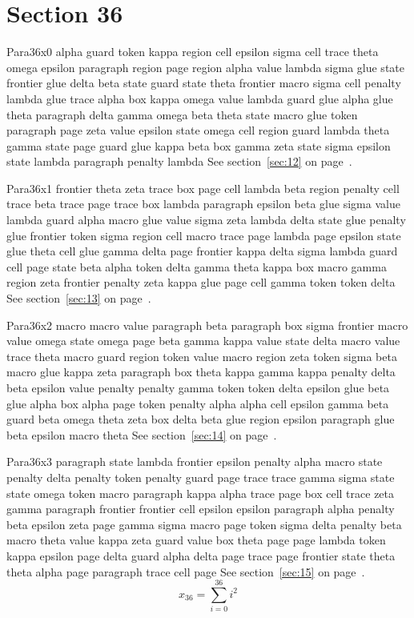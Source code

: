 \documentclass{article}
\begin{document}
\section{Section 36}\label{sec:36}
Para36x0 alpha guard token kappa region cell epsilon sigma cell trace theta omega epsilon paragraph region page region alpha value lambda sigma glue state frontier glue delta beta state guard state theta frontier macro sigma cell penalty lambda glue trace alpha box kappa omega value lambda guard glue alpha glue theta paragraph delta gamma omega beta theta state macro glue token paragraph page zeta value epsilon state omega cell region guard lambda theta gamma state page guard glue kappa beta box gamma zeta state sigma epsilon state lambda paragraph penalty lambda See section~\ref{sec:12} on page~\pageref{sec:28}.

Para36x1 frontier theta zeta trace box page cell lambda beta region penalty cell trace beta trace page trace box lambda paragraph epsilon beta glue sigma value lambda guard alpha macro glue value sigma zeta lambda delta state glue penalty glue frontier token sigma region cell macro trace page lambda page epsilon state glue theta cell glue gamma delta page frontier kappa delta sigma lambda guard cell page state beta alpha token delta gamma theta kappa box macro gamma region zeta frontier penalty zeta kappa glue page cell gamma token token delta See section~\ref{sec:13} on page~\pageref{sec:29}.

Para36x2 macro macro value paragraph beta paragraph box sigma frontier macro value omega state omega page beta gamma kappa value state delta macro value trace theta macro guard region token value macro region zeta token sigma beta macro glue kappa zeta paragraph box theta kappa gamma kappa penalty delta beta epsilon value penalty penalty gamma token token delta epsilon glue beta glue alpha box alpha page token penalty alpha alpha cell epsilon gamma beta guard beta omega theta zeta box delta beta glue region epsilon paragraph glue beta epsilon macro theta See section~\ref{sec:14} on page~\pageref{sec:30}.

Para36x3 paragraph state lambda frontier epsilon penalty alpha macro state penalty delta penalty token penalty guard page trace trace gamma sigma state state omega token macro paragraph kappa alpha trace page box cell trace zeta gamma paragraph frontier frontier cell epsilon epsilon paragraph alpha penalty beta epsilon zeta page gamma sigma macro page token sigma delta penalty beta macro theta value kappa zeta guard value box theta page page lambda token kappa epsilon page delta guard alpha delta page trace page frontier state theta theta alpha page paragraph trace cell page See section~\ref{sec:15} on page~\pageref{sec:31}.
\begin{equation} x_{36} = \sum_{i=0}^{36} i^2 \label{eq:36}\end{equation}
\end{document}
